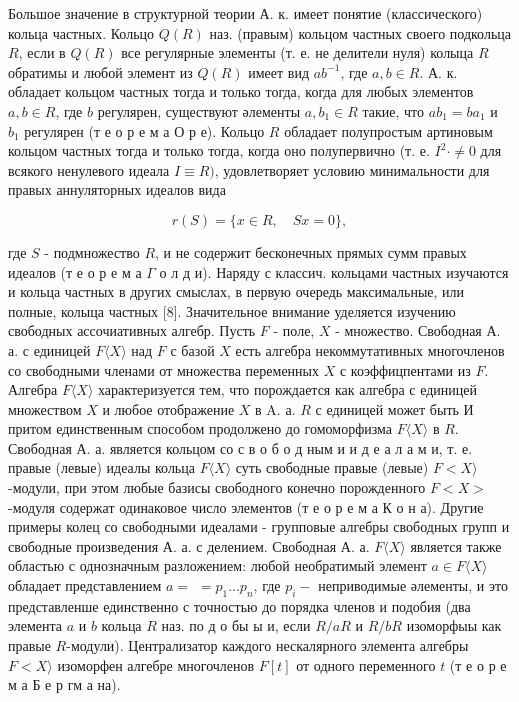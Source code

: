 \documentclass[10pt]{article}
\begin{document}
Большое значение в структурной теории А. к. имеет понятие (классического) кольца частных. Кольцо $Q(R)$ наз. (правым) кольцом частных своего подкольца $R$, если в $Q(R)$ все регулярные элементы (т. е. не делители нуля) колыца $R$ обратимы и любой элемент из $Q(R)$ имеет вид $a b^{-1}$, где $a, b \in R$. А. к. обладает кольцом частных тогда и только тогда, когда для любых элементов $a, b \in R$, где $b$ регулярен, существуют әлементы $a, b_{1} \in R$ такие, что $a b_{1}=b a_{1}$ и $b_{1}$ регулярен (т е о р е м а О р е). Кольцо $R$ обладает полупростым артиновым кольцом частных тогда и только тогда, когда оно полупервично (т. е. $I^{2} \cdot \neq 0$ для всякого ненулевого идеала $I \equiv R)$, удовлетворяет условию минимальности для правых аннуляторных идеалов вида



\[

r(S)=\{x \in R, \quad S x=0\},

\]



где $S$ - подмножество $R$, и не содержит бесконечных прямых сумм правых идеалов (т е о р е м а $\Gamma$ о л д и). Наряду с классич. кольцами частных изучаются и кольца частных в других смыслах, в первую очередь максимальные, или полные, колыца частных [8]. Значительное внимание уделяется изучению свободных ассочиативных алгебр. Пусть $F$ - поле, $X$ - множество. Свободная А. а. с единицей $F\langle X\rangle$ над $F$ с базой $X$ есть алгебра некоммутативных многочленов со свободными членами от множества переменных $X$ с коэффицпентами из $F$. Алгебра $F\langle X\rangle$ характеризуется тем, что порождается как алгебра с единицей множеством $X$ и любое отображение $X$ в A. а. $R$ с единицей может быть И притом единственным способом продолжено до гомоморфизма $F\langle X\rangle$ в $R$. Свободная А. а. является кольцом со с в о б о д ным и и д е а л а м и, т. е. правые (левые) идеалы кольца $F\langle X\rangle$ суть свободные правые (левые) $F<X\rangle$-модули, при этом любые базисы свободного конечно порожденного $F<X>$-модуля содержат одинаковое число элементов (т е о р е м а $К$ о н а). Другие примеры колец со свободными идеалами - групповые алгебры свободных групп и свободные произведения А. а. с делением. Свободная А. а. $F\langle X\rangle$ является также областью с однозначным разложением: любой необратимый элемент $a \in F\langle X\rangle$ обладает представлением $a=$ $=p_{1} \ldots p_{n}$, где $p_{i}-$ неприводимые әлементы, и это представленше единственно с точностью до порядка членов и подобия (два элемента $a$ и $b$ кольца $R$ наз. по д о бы ы и, если $R / a R$ и $R / b R$ изоморфыы как правые $R$-модули). Централизатор каждого нескалярного элемента алгебры $F<X\rangle$ изоморфен алгебре многочленов $F[t]$ от одного переменного $t$ (т е о р е м а Б е р гм а на).
\end{document}
